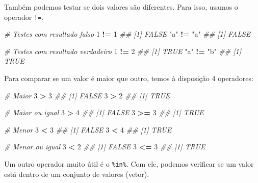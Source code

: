 \documentclass[]{book}
\newenvironment{Shaded}{\begin{snugshade}}{\end{snugshade}}
\newcommand{\CommentTok}[1]{\textcolor[rgb]{0.56,0.35,0.01}{\textit{#1}}}
\newcommand{\DecValTok}[1]{\textcolor[rgb]{0.00,0.00,0.81}{#1}}
\newcommand{\KeywordTok}[1]{\textcolor[rgb]{0.13,0.29,0.53}{\textbf{#1}}}
\newcommand{\NormalTok}[1]{#1}
\newcommand{\OperatorTok}[1]{\textcolor[rgb]{0.81,0.36,0.00}{\textbf{#1}}}
\newcommand{\StringTok}[1]{\textcolor[rgb]{0.31,0.60,0.02}{#1}}
\begin{document}
Também podemos testar se dois valores são diferentes. Para isso, usamos o operador \texttt{!=}.

\begin{Shaded}
\begin{Highlighting}[]
\CommentTok{# Testes com resultado falso}
\DecValTok{1} \OperatorTok{!=}\StringTok{ }\DecValTok{1}
\CommentTok{## [1] FALSE}
\StringTok{"a"} \OperatorTok{!=}\StringTok{ "a"}
\CommentTok{## [1] FALSE}

\CommentTok{# Testes com resultado verdadeiro}
\DecValTok{1} \OperatorTok{!=}\StringTok{ }\DecValTok{2}
\CommentTok{## [1] TRUE}
\StringTok{"a"} \OperatorTok{!=}\StringTok{ "b"}
\CommentTok{## [1] TRUE}
\end{Highlighting}
\end{Shaded}

Para comparar se um valor é maior que outro, temos à disposição 4 operadores:

\begin{Shaded}
\begin{Highlighting}[]
\CommentTok{# Maior}
\DecValTok{3} \OperatorTok{>}\StringTok{ }\DecValTok{3}
\CommentTok{## [1] FALSE}
\DecValTok{3} \OperatorTok{>}\StringTok{ }\DecValTok{2}
\CommentTok{## [1] TRUE}

\CommentTok{# Maior ou igual}
\DecValTok{3} \OperatorTok{>}\StringTok{ }\DecValTok{4}
\CommentTok{## [1] FALSE}
\DecValTok{3} \OperatorTok{>=}\StringTok{ }\DecValTok{3}
\CommentTok{## [1] TRUE}

\CommentTok{# Menor }
\DecValTok{3} \OperatorTok{<}\StringTok{ }\DecValTok{3}
\CommentTok{## [1] FALSE}
\DecValTok{3} \OperatorTok{<}\StringTok{ }\DecValTok{4}
\CommentTok{## [1] TRUE}

\CommentTok{# Menor ou igual}
\DecValTok{3} \OperatorTok{<}\StringTok{ }\DecValTok{2}
\CommentTok{## [1] FALSE}
\DecValTok{3} \OperatorTok{<=}\StringTok{ }\DecValTok{3}
\CommentTok{## [1] TRUE}
\end{Highlighting}
\end{Shaded}

Um outro operador muito útil é o \texttt{\%in\%}. Com ele, podemos verificar se um valor está dentro de um conjunto de valores (vetor).

\begin{Shaded}
\end{Shaded}
\end{document}
